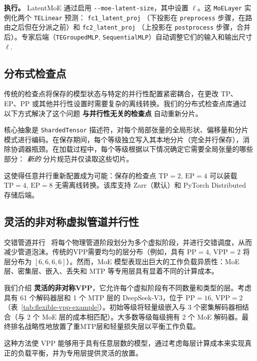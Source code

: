 \documentclass[10pt,logo,copyright]{nvidiatechreport_zh}
\begin{document}
\textbf{执行。}
LatentMoE 通过启用 \texttt{-{}-moe-latent-size}，其中设置 \(\ell\)。这 \texttt{MoELayer} 实例化两个 \texttt{TELinear} 预测： \texttt{fc1\_latent\_proj} （下投影在 \texttt{preprocess} 步骤，在路由之后但在分派之前）和 \texttt{fc2\_latent\_proj} （上投影在 \texttt{postprocess} 步骤，合并后）。专家后端（\texttt{TEGroupedMLP}, \texttt{SequentialMLP}）自动调整它们的输入和输出尺寸 \(\ell\).

\subsection{分布式检查点}

传统的检查点将保存的模型状态与特定的并行性配置紧密耦合，在更改 TP、EP、PP 或其他并行性设置时需要复杂的离线转换。我们的分布式检查点库通过以下方式解决了这个问题 \textbf{与并行性无关的检查点} 自动重新分片。

核心抽象是 \texttt{ShardedTensor} 描述符，对每个局部张量的全局形状、偏移量和分片模式进行编码。在保存期间，每个等级独立写入其本地分片（完全并行保存），消除协调器瓶颈。在加载过程中，每个等级根据以下情况确定它需要全局张量的哪些部分： \textit{新的} 分片规范并仅读取这些切片。

这使得任意并行重新配置成为可能：保存的检查点 $\text{TP}=2$, $\text{EP}=4$ 可以装载 $\text{TP}=4$, $\text{EP}=8$ 无需离线转换。该库支持 Zarr（默认）和 PyTorch Distributed~\cite{zhao2023pytorchfsdp} 存储后端。

\subsection{灵活的非对称虚拟管道并行性}\label{sec:flexible-vpp}

交错管道并行~\cite{narayanan2021efficient} 将每个物理管道阶段划分为多个虚拟阶段，并进行交错调度，从而减少管道泡沫。传统的VPP需要均匀的层分布（例如，具有 $\text{PP}=4$, $\text{VPP}=2$ 将层分布为 $[6, 6, 6, 6]$）。然而，MoE 模型表现出巨大的工作负载异质性：MoE 层、密集层、嵌入、丢失和 MTP 等专用层具有显着不同的计算成本。

我们介绍 \textbf{灵活的非对称VPP}，它允许每个虚拟阶段有不同数量和类型的层。考虑具有 61 个解码器层和 1 个 MTP 层的 DeepSeek-V3，位于 $\text{PP}=16$, $\text{VPP}=2$ （表~\ref{tab:flexible-vpp-example}）。初始等级将轻量级嵌入与 3 个密集解码器相结合（与 2 个 MoE 层的成本相匹配）。大多数等级每级拥有 2 个 MoE 解码器。最终排名战略性地放置了重MTP层和轻量损失层以平衡工作负载。

这种方法使 VPP 能够用于具有任意层数的模型，通过考虑每层计算成本来实现真正的负载平衡，并为专用层提供灵活的放置。
\end{document}
